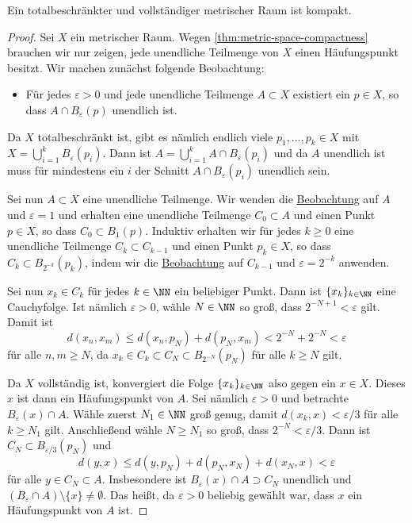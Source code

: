 \begin{theorem}\label{thm:totally-bounded-complete-compact}
Ein totalbeschränkter und vollständiger metrischer Raum ist kompakt.
\end{theorem}
\begin{proof}
  Sei $X$ ein metrischer Raum. Wegen \autoref{thm:metric-space-compactness} brauchen wir nur zeigen, jede unendliche Teilmenge von $X$ einen Häufungspunkt besitzt. Wir machen zunächst folgende Beobachtung:

  \begin{itemize}
    \item\label{observation-1} Für jedes $\varepsilon>0$ und jede unendliche Teilmenge $A\subset X$ existiert ein $p\in X$, so dass $A \cap B_\varepsilon(p)$ unendlich ist.
  \end{itemize}
  Da $X$ totalbeschränkt ist, gibt es nämlich endlich viele $p_1,\dots,p_k\in X$ mit $X = \bigcup_{i=1}^k B_\varepsilon(p_i)$. Dann ist $A = \bigcup_{i=1}^k A\cap B_\varepsilon(p_i)$ und da $A$ unendlich ist muss für mindestens ein $i$ der Schnitt $A\cap B_\varepsilon(p_i)$ unendlich sein.

  Sei nun $A\subset X$ eine unendliche Teilmenge. Wir wenden die \hyperref[observation-1]{Beobachtung} auf $A$ und $\varepsilon = 1$ und erhalten eine unendliche Teilmenge $C_0\subset A$ und einen Punkt $p\in X$, so dass $C_0 \subset B_1(p)$. Induktiv erhalten wir für jedes $k\geq 0$ eine unendliche Teilmenge $C_k\subset C_{k-1}$ und einen Punkt $p_k\in X$, so dass $C_k\subset B_{2^{-k}}(p_k)$, indem wir die \hyperref[observation-1]{Beobachtung} auf $C_{k-1}$ und $\varepsilon = 2^{-k}$ anwenden.

  Sei nun $x_k\in C_k$ für jedes $k\in\NN$ ein beliebiger Punkt. Dann ist $\{x_k\}_{k\in\NN}$ eine Cauchyfolge. Ist nämlich $\varepsilon > 0$, wähle $N\in\NN$ so groß, dass $2^{-N+1}<\varepsilon$ gilt. Damit ist
  \[
    d(x_n, x_m) \leq d(x_n, p_N) + d(p_N, x_m) < 2^{-N} + 2^{-N} < \varepsilon
  \]
  für alle $n,m\geq N$, da $x_k\in C_k\subset C_N\subset B_{2^{-N}}(p_N)$ für alle $k\geq N$ gilt.

  Da $X$ vollständig ist, konvergiert die Folge $\{x_k\}_{k\in\NN}$ also gegen ein $x\in X$. Dieses $x$ ist dann ein Häufungspunkt von $A$. Sei nämlich $\varepsilon > 0$ und betrachte $B_{\varepsilon}(x)\cap A$. Wähle zuerst $N_1\in\NN$ groß genug, damit $d(x_k,x) < \varepsilon/3$ für alle $k\geq N_1$ gilt. Anschließend wähle $N \geq N_1$ so groß, dass $2^{-N} < \varepsilon/3$. Dann ist $C_N\subset B_{\varepsilon/3}(p_N)$ und
  \[
    d(y,x) \leq d(y, p_N) + d(p_N, x_N) + d(x_N, x) < \varepsilon
  \]
  für alle $y\in C_N\subset A$. Insbesondere ist $B_{\varepsilon}(x)\cap A\supset C_N$ unendlich und $(B_{\varepsilon}\cap A)\setminus\{x\}\neq\emptyset$. Das heißt, da $\varepsilon > 0$ beliebig gewählt war, dass $x$ ein Häufungspunkt von $A$ ist.
\end{proof}

